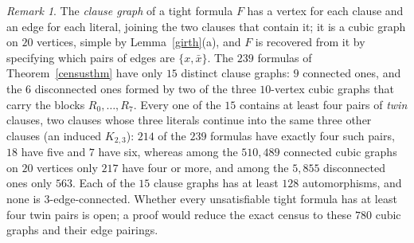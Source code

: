 \documentclass[11pt]{article}
\theoremstyle{remark}\newtheorem{remark}[theorem]{Remark}
\begin{document}
\begin{remark}
The \emph{clause graph} of a tight formula $F$ has a vertex for each clause and an edge for each literal, joining the two clauses that contain it; it is a cubic graph on $20$ vertices, simple by Lemma~\ref{girth}(a), and $F$ is recovered from it by specifying which pairs of edges are $\{x,\bar x\}$. The $239$ formulas of Theorem~\ref{censusthm} have only $15$ distinct clause graphs: $9$ connected ones, and the $6$ disconnected ones formed by two of the three $10$-vertex cubic graphs that carry the blocks $R_0,\dots,R_7$. Every one of the $15$ contains at least four pairs of \emph{twin} clauses, two clauses whose three literals continue into the same three other clauses (an induced $K_{2,3}$): $214$ of the $239$ formulas have exactly four such pairs, $18$ have five and $7$ have six, whereas among the $510{,}489$ connected cubic graphs on $20$ vertices only $217$ have four or more, and among the $5{,}855$ disconnected ones only $563$. Each of the $15$ clause graphs has at least $128$ automorphisms, and none is $3$-edge-connected. Whether every unsatisfiable tight formula has at least four twin pairs is open; a proof would reduce the exact census to these $780$ cubic graphs and their edge pairings.
\end{remark}
\end{document}
